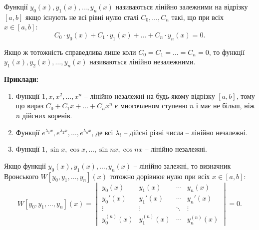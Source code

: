 \begin{definition}
	Функції $y_0(x), y_1(x), \ldots, y_n(x)$ називаються лінійно залежними на відрізку $[a,b]$ якщо існують не всі рівні нулю сталі $C_0, \ldots, C_n$ такі, що при всіх $x \in [a,b]$: 
	\begin{equation}
		\label{eq:3.1.18}
		C_0 \cdot y_0(x) + C_1 \cdot y_1(x) + \ldots + C_n \cdot y_n(x) = 0.
	\end{equation}

	Якщо ж тотожність справедлива лише коли $C_0 = C_1 = \ldots = C_n = 0$, то функції $y_1(x), y_2(x), \ldots, y_n(x)$ називаються лінійно незалежними.
\end{definition}

\textbf{Приклади:}
\begin{enumerate}
	\item Функції $1, x, x^2, \ldots, x^n$ -- лінійно незалежні на будь-якому відрізку $[a,b]$, тому що вираз $C_0 + C_1 x + \ldots + C_n x^n$ є многочленом ступеню $n$ і має не більш, ніж $n$ дійсних коренів.
	\item Функції $e^{\lambda_1 x}, e^{\lambda_2 x}, \ldots, e^{\lambda_n x}$, де всі $\lambda_i$ -- дійсні різні числа -- лінійно незалежні. 
	\item Функції $1, \sin x, \cos x, \ldots, \sin nx, \cos nx$ -- лінійно незалежні.
\end{enumerate}

\begin{theorem}
	Якщо функції $y_0(x), y_1(x), \ldots, y_n(x)$ -- лінійно залежні, то визначник Вронського $W[y_0, y_1, \ldots, y_n](x)$ тотожно дорівнює нулю при всіх $x \in [a,b]$:
	\begin{equation}
		\label{eq:3.1.19}
		W[y_0, y_1, \ldots, y_n](x) = \begin{vmatrix} y_0(x) & y_1(x) & \cdots & y_n(x) \\ y_0'(x) & y_1'(x) & \cdots & y_n'(x) \\ \vdots & \vdots & \ddots & \vdots \\ y_0^{(n)}(x) & y_1^{(n)}(x) & \cdots & y_n^{(n)}(x) \end{vmatrix} = 0.
	\end{equation}
\end{theorem}

